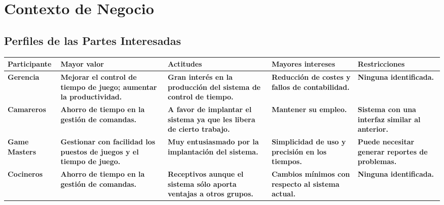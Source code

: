 \documentclass[a4paper,11pt]{article}
\begin{document}
	\section{Contexto de Negocio}
		\subsection{Perfiles de las Partes Interesadas}
			\begin{center}
				\begin{tabular}{| p{2,4cm} | p{} | p{2cm} | p{} | p{} |}
					\hline
					\cellcolor[RGB]{224,233,250}\textbf{Participante} & \cellcolor[RGB]{224,233,250}\textbf{Mayor 							valor} & \cellcolor[RGB]{224,233,250}\textbf{Actitudes} & \cellcolor[RGB]										{224,233,250}\textbf{Mayores intereses} & \cellcolor[RGB]{224,233,250}\textbf{Restricciones} \\
					\hline
					\textbf{Gerencia} & \textbf{Mejorar el control de tiempo de juego; aumentar la productividad.} & 							\textbf{Gran interés en la producción del sistema de control de tiempo.} & \textbf{Reducción de 							costes y fallos de contabilidad. } & \textbf{Ninguna identificada.} \\
					\hline
					\textbf{Camareros} & \textbf{Ahorro de tiempo en la gestión de comandas.} & \textbf{A favor de 							implantar el sistema ya que les libera de cierto trabajo.} & \textbf{Mantener su empleo.} & 								\textbf{Sistema con una interfaz similar al anterior.} \\
					\hline
					\textbf{Game Masters} & \textbf{Gestionar con facilidad los puestos de juegos y el tiempo de 							juego.} & \textbf{Muy entusiasmado por la implantación del sistema.} & \textbf{Simplicidad de uso y 					precisión en los tiempos.} & \textbf{Puede necesitar generar reportes de problemas.} \\
					\hline
					\textbf{Cocineros} & \textbf{Ahorro de tiempo en la gestión de comandas.} & \textbf{Receptivos 							aunque el sistema sólo aporta ventajas a otros grupos. } & \textbf{Cambios mínimos con respecto al 					sistema actual.} & \textbf{Ninguna identificada.} \\
					\hline
				\end{tabular}
			\end{center}
\end{document}
